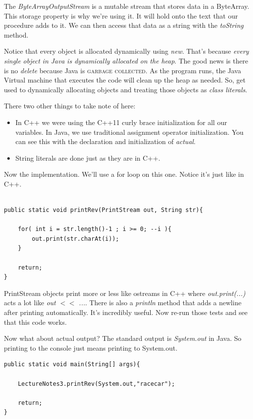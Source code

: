 \documentclass[]{tufte-handout}
\begin{document}
The \textit{ByteArrayOutputStream} is a mutable stream that stores data in a ByteArray. This storage property is why we're using it. It will hold onto the text that our procedure adds to it. We can then access that data as a string with the \textit{toString} method. 

Notice that every object is allocated dynamically using \textit{new}. That's because \textit{every single object in Java is dynamically allocated on the heap}. The good news is there is no \textit{delete} because Java is \textsc{garbage collected}. As the program runs, the Java Virtual machine that executes the code will clean up the heap as needed. So, get used to dynamically allocating objects and treating those objects as \textit{class literals}. 

There two other things to take note of here:
\begin{itemize}
\item In C++ we were using the C++11 curly brace initialization for all our variables. In Java, we use traditional assignment operator initialization. You can see this with the declaration and initialization of \textit{actual}. 
\item String literals are done just as they are in C++. 
\end{itemize}

Now the implementation. We'll use a for loop on this one. Notice it's just like in C++.

\begin{lstlisting}

public static void printRev(PrintStream out, String str){
		
	for( int i = str.length()-1 ; i >= 0; --i ){
		out.print(str.charAt(i));
	}
	
	return;
}

\end{lstlisting}

PrintStream objects print more or less like ostreams in C++ where \textit{out.print(...)} acts a lot like \textit{out $<<$ ...}. There is also a \textit{println} method that adds a newline after printing automatically. It's incredibly useful. Now re-run those tests and see that this code works.

Now what about actual output? The standard output is \textit{System.out} in Java. So printing to the console just means printing to System.out.

\begin{lstlisting}
public static void main(String[] args){
	
	LectureNotes3.printRev(System.out,"racecar");
	
	return;
}	
\end{lstlisting}
\end{document}
